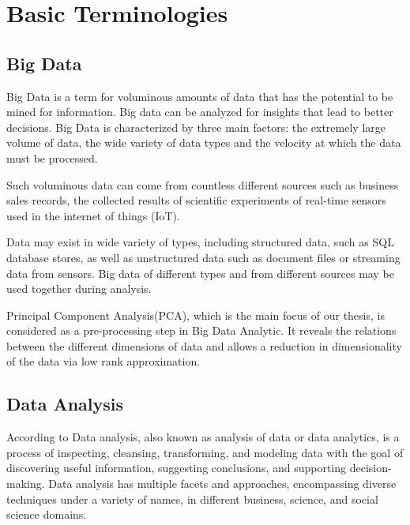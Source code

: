 \documentclass[12pt,notitlepage,oneside]{report}
\begin{document}


%


\chapter{Basic Terminologies}
	\label{c:2}
\section{Big Data}
Big Data is a term for voluminous amounts of data that has the potential to be mined for information. Big data can be analyzed for insights that lead to better decisions. Big Data is characterized by three main factors: the extremely large volume of data, the wide variety of data types and the velocity at which the data must be processed. 

Such voluminous data can come from countless different sources such as business sales records, the collected results of scientific experiments of real-time sensors used in the internet of things (IoT).

Data may exist in wide variety of types, including structured data, such as SQL database stores, as well as unstructured data such as document files or streaming data from sensors. Big data of different types and from different sources may be used together during analysis.

Principal Component Analysis(PCA), which is the main focus of our thesis, is considered as a pre-processing step in Big Data Analytic. It reveals the relations between the different dimensions of data and allows a reduction in dimensionality of the data via low rank approximation.

\section{Data Analysis}
According to \cite{dataanalysis} Data analysis, also known as analysis of data or data analytics, is a process of inspecting, cleansing, transforming, and modeling data with the goal of discovering useful information, suggesting conclusions, and supporting decision-making. Data analysis has multiple facets and approaches, encompassing diverse techniques under a variety of names, in different business, science, and social science domains.
\end{document}
